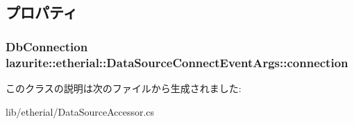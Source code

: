 \subsection{プロパティ}
\hypertarget{classlazurite_1_1etherial_1_1_data_source_connect_event_args_a8ec9c97736251b574749fa524d8c1cd7}{
\subsubsection[{connection}]{\setlength{\rightskip}{0pt plus 5cm}DbConnection lazurite::etherial::DataSourceConnectEventArgs::connection}}
\label{classlazurite_1_1etherial_1_1_data_source_connect_event_args_a8ec9c97736251b574749fa524d8c1cd7}


このクラスの説明は次のファイルから生成されました:\begin{DoxyCompactItemize}
\item 
lib/etherial/DataSourceAccessor.cs\end{DoxyCompactItemize}
